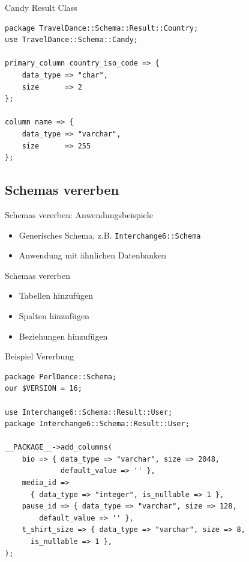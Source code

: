 \begin{frame}[fragile]{Candy Result Class}
\begin{lstlisting}
package TravelDance::Schema::Result::Country;
use TravelDance::Schema::Candy;

primary_column country_iso_code => {
    data_type => "char",
    size      => 2
};

column name => {
    data_type => "varchar",
    size      => 255
};
\end{lstlisting}
\end{frame}

\subsection{Schemas vererben}

\begin{frame}[fragile]{Schemas vererben: Anwendungsbeispiele}
\begin{itemize}
\item Generisches Schema, z.B. \verb|Interchange6::Schema|
\item Anwendung mit ähnlichen Datenbanken
\end{itemize}
\end{frame}

\begin{frame}{Schemas vererben}
\begin{itemize}
\item Tabellen hinzufügen
\item Spalten hinzufügen
\item Beziehungen hinzufügen
\end{itemize}
\end{frame}

\begin{frame}[fragile]{Beispiel Vererbung}
\begin{lstlisting}
package PerlDance::Schema;
our $VERSION = 16;

use Interchange6::Schema::Result::User;
package Interchange6::Schema::Result::User;

__PACKAGE__->add_columns(
    bio => { data_type => "varchar", size => 2048, 
             default_value => '' },
    media_id =>
      { data_type => "integer", is_nullable => 1 },
    pause_id => { data_type => "varchar", size => 128, 
        default_value => '' },
    t_shirt_size => { data_type => "varchar", size => 8, 
      is_nullable => 1 },
);
\end{lstlisting}
\end{frame}


